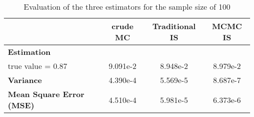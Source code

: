 \begin{table}[H]
    \centering
    \caption{Evaluation of the three estimators for the sample size of 100}
    \label{table:illustrative_results_100}
    \small
    \begin{tabular}{lccc}
        \hline
        & \textbf{crude MC} & \textbf{Traditional IS} & \textbf{MCMC IS} \\ 
            \hline
        \textbf{Estimation}\\
        true value = 0.87 & 9.091e-2 & 8.948e-2 & 8.979e-2\\
        \textbf{Variance} & 4.390e-4 & 5.569e-5 & 8.687e-7\\
        \textbf{Mean Square Error (MSE)} & 4.510e-4 & 5.981e-5 & 6.373e-6\\
        \hline
    \end{tabular}
\end{table}